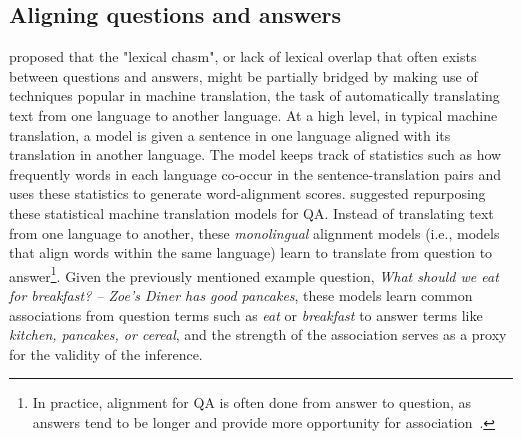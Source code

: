 
\subsection{Aligning questions and answers}
\label{sec:intro_naacl2015}
\citet{Berger:00} proposed that the "lexical chasm", or lack of lexical overlap that often exists between questions and answers, might be partially bridged by making use of techniques popular in machine translation, the task of automatically translating text from one language to another language.  At a high level, in typical machine translation, a model is given a sentence in one language aligned with its translation in another language.  The model keeps track of statistics such as how frequently words in each language co-occur in the sentence-translation pairs and uses these statistics to generate word-alignment scores.  \citeauthor{Berger:00} suggested repurposing these statistical machine translation models for QA. Instead of translating text from one language to another, these \emph{monolingual} alignment models (i.e., models that align words within the same language) learn to translate from question to answer\footnote{In practice, alignment for QA is often done from answer to question, as answers tend to be longer and provide more opportunity for association~\citep{Surdeanu:11}.}.  Given the previously mentioned example question, {\em What should we eat for breakfast? -- Zoe's Diner has good pancakes}, these models learn common associations from question terms such as {\em eat} or {\em breakfast} to answer terms like {\em kitchen, pancakes, or cereal}, and the strength of the association serves as a proxy for the validity of the inference.

